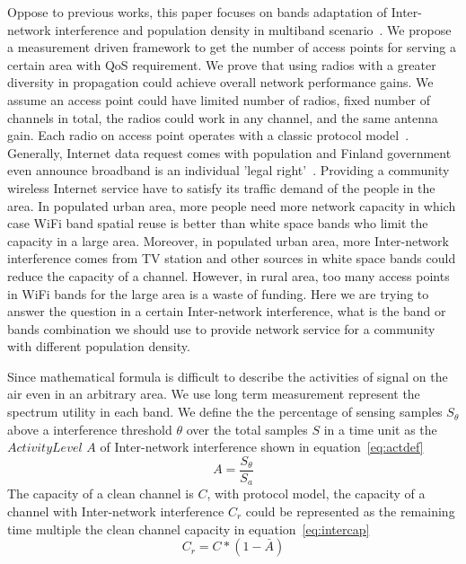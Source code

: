 Oppose to previous works, this paper focuses on bands adaptation of Inter-network 
interference and population density in multiband scenario~\cite{tang2005interference,yuan2006cross
,si2010overview}. We propose a measurement driven framework to get the  
number of access points for serving a certain area with QoS requirement.
We prove that using radios with a greater diversity in propagation could 
achieve overall network performance gains. 
We assume an access point could have limited number of radios, fixed number of 
channels in total, the radios could work in any channel, and the same antenna gain.
Each radio on access point operates with a classic protocol model~\cite{gupta2000capacity}. 
Generally, Internet data request comes with population and Finland government even announce 
broadband is an individual 'legal right'~\cite{bbcfinland,rosston2011household}. 
Providing a community wireless Internet service have to satisfy its traffic demand 
of the people in the area. In populated urban area, more people need more 
network capacity in which case WiFi band spatial reuse is better than white space bands
who limit the capacity in a large area. Moreover, in populated urban area, 
more Inter-network interference comes from TV station and other sources in white space
bands could reduce the capacity of a channel. However, in rural area, too many access points
in WiFi bands for the large area is a waste of funding. Here we are trying to answer the question
 in a certain Inter-network interference, what is the band or bands combination we should 
 use to provide network service for a community with different population density.

Since mathematical formula is difficult to describe the activities of 
signal on the air even in an arbitrary area.
We use long term measurement represent the spectrum utility in each band. 
We define the the percentage of sensing samples $S_\theta$ above a 
interference threshold $\theta$ over the total samples $S$ in a time unit as the 
{\it $Activity Level$} $A$ of Inter-network interference shown in equation~\ref{eq:actdef}
\begin{equation}
\label{eq:actdef}
A=\frac{S_\theta}{S_a}
\end{equation}
The capacity of a clean channel is $C$, with protocol model, the capacity 
of a channel with Inter-network interference $C_r$ could be represented as 
the remaining time multiple the clean channel capacity in equation~\ref{eq:intercap}
\begin{equation}
\label{eq:intercap}
C_r=C*(1-\bar{A})
\end{equation}


